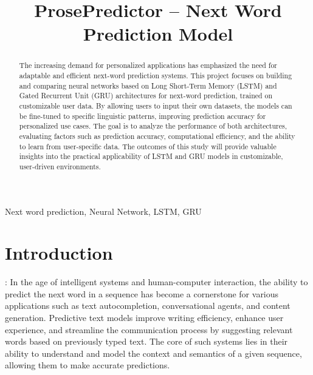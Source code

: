 \documentclass[conference]{IEEEtran}
\begin{document}
\title{ProsePredictor – Next Word Prediction Model\\}

\author{



\and
{}
} \maketitle

\begin{abstract} The increasing demand for personalized applications has emphasized the need for adaptable and efficient next-word prediction systems. This project focuses on building and comparing neural networks based on Long Short-Term Memory (LSTM) and Gated Recurrent Unit (GRU) architectures for next-word prediction, trained on customizable user data. By allowing users to input their own datasets, the models can be fine-tuned to specific linguistic patterns, improving prediction accuracy for personalized use cases. The goal is to analyze the performance of both architectures, evaluating factors such as prediction accuracy, computational efficiency, and the ability to learn from user-specific data. The outcomes of this study will provide valuable insights into the practical applicability of LSTM and GRU models in customizable, user-driven environments.
 \end{abstract}
 \begin{IEEEkeywords}Next word prediction, Neural Network, LSTM, GRU
 \end{IEEEkeywords}

\section{Introduction}: In the age of intelligent systems and human-computer interaction, the ability to predict the next word in a sequence has become a cornerstone for various applications such as text autocompletion, conversational agents, and content generation. Predictive text models improve writing efficiency, enhance user experience, and streamline the communication process by suggesting relevant words based on previously typed text. The core of such systems lies in their ability to understand and model the context and semantics of a given sequence, allowing them to make accurate predictions.
\end{document}
